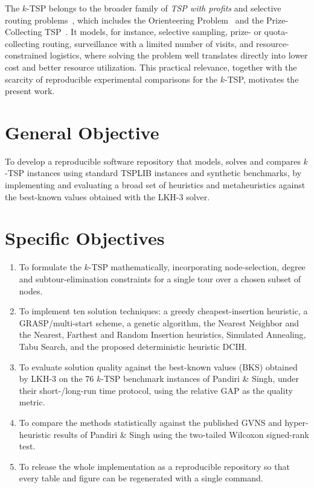 \documentclass[12pt,a4paper,oneside]{report}
\begin{document}
The $k$-TSP belongs to the broader family of \emph{TSP with profits} and
selective routing problems~\cite{feillet2005profits}, which includes the
Orienteering Problem~\cite{vansteenwegen2011top} and the Prize-Collecting
TSP~\cite{balas1989pctsp}. It models, for instance, selective sampling, prize- or
quota-collecting routing, surveillance with a limited number of visits, and
resource-constrained logistics, where solving the problem well translates
directly into lower cost and better resource utilization. This practical
relevance, together with the scarcity of reproducible experimental comparisons
for the $k$-TSP, motivates the present work.

\section{General Objective}
To develop a reproducible software repository that models, solves and compares
$k$-TSP instances using standard TSPLIB instances and synthetic benchmarks, by
implementing and evaluating a broad set of heuristics and metaheuristics against
the best-known values obtained with the LKH-3 solver.

\section{Specific Objectives}
\begin{enumerate}[label=\arabic*.,leftmargin=*]
  \item To formulate the $k$-TSP mathematically, incorporating node-selection,
  degree and subtour-elimination constraints for a single tour over a chosen
  subset of nodes.
  \item To implement ten solution techniques: a greedy cheapest-insertion
  heuristic, a GRASP/multi-start scheme, a genetic algorithm, the Nearest
  Neighbor and the Nearest, Farthest and Random Insertion heuristics, Simulated
  Annealing, Tabu Search, and the proposed deterministic heuristic DCIH.
  \item To evaluate solution quality against the best-known values (BKS) obtained
  by LKH-3 on the 76 $k$-TSP benchmark instances of Pandiri \& Singh, under their
  short-/long-run time protocol, using the relative GAP as the quality metric.
  \item To compare the methods statistically against the published GVNS and
  hyper-heuristic results of Pandiri \& Singh using the two-tailed Wilcoxon
  signed-rank test.
  \item To release the whole implementation as a reproducible repository so that
  every table and figure can be regenerated with a single command.
\end{enumerate}
\end{document}
